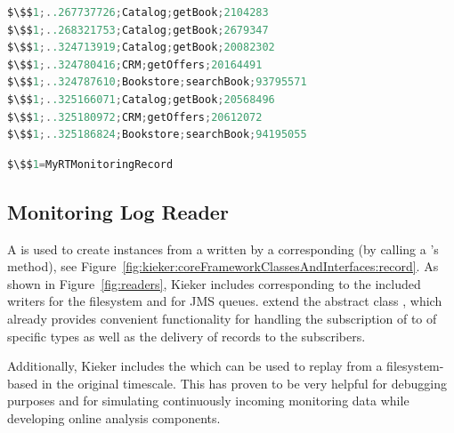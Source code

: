\begin{minipage}{\columnwidth}
\begin{lstlisting}[language=Java, numbers=none, xleftmargin=0pt, caption=Filesystem Monitoring Log with Monitoring Records of type MyRTMonitoringRecord, label=lst:RTMonitoringLog, basicstyle=\ttfamily\footnotesize]
$\$$1;..267737726;Catalog;getBook;2104283
$\$$1;..268321753;Catalog;getBook;2679347
$\$$1;..324713919;Catalog;getBook;20082302
$\$$1;..324780416;CRM;getOffers;20164491
$\$$1;..324787610;Bookstore;searchBook;93795571
$\$$1;..325166071;Catalog;getBook;20568496
$\$$1;..325180972;CRM;getOffers;20612072
$\$$1;..325186824;Bookstore;searchBook;94195055
\end{lstlisting}

\begin{lstlisting}[language=Java, numbers=none, xleftmargin=0pt, caption=Mapping of Monitoring Record type identifier to implementing class, label=lst:RTMonitoringLogMapping, basicstyle=\ttfamily\small]
$\$$1=MyRTMonitoringRecord
\end{lstlisting}
\end{minipage}

\subsection{Monitoring Log Reader}

\noindent A \MonitoringLogReader{} is used to create \MonitoringRecord{} instances from %
a \MonitoringLog{} written by a corresponding \MonitoringLogWriter{} (by
calling a \MonitoringRecord{}'s  method), see Figure~\ref{fig:kieker:coreFrameworkClassesAndInterfaces:record}. %
As shown in Figure~\ref{fig:readers}, %
Kieker includes \MonitoringLogReaders{} corresponding to the included writers %
for the filesystem and for JMS queues. %
\MonitoringLogReaders{} extend the abstract class ,
which already provides convenient functionality for handling the subscription of %
\MonitoringRecordConsumers{} to \MonitoringRecords{} of specific types as well as %
the delivery of records to the subscribers. %

Additionally, Kieker includes the \MonitoringLogReader{}  %
which can be used to replay \MonitoringRecords{} from a filesystem-based %
\MonitoringLog{} in the original timescale. This has proven to be very helpful for debugging purposes and for simulating %
continuously incoming monitoring data while developing online analysis components. %
% 
